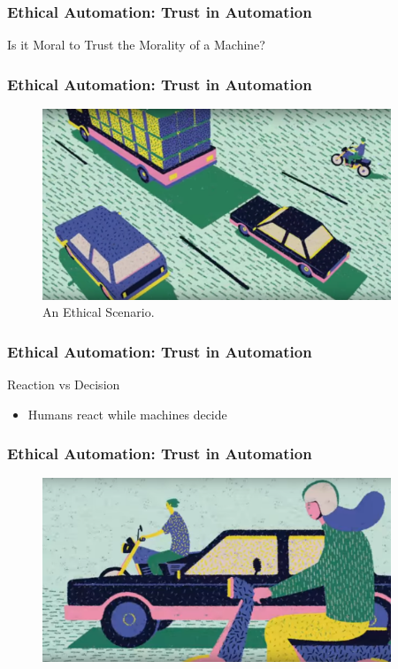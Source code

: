 \begin{frame}
	\frametitle{ Ethical Automation: Trust in Automation}
	\Large{Is it Moral to Trust the Morality of a Machine?}
\end{frame}


\begin{frame}
	\frametitle{ Ethical Automation: Trust in Automation}
	\begin{figure}[bht]
		\centering
		\includegraphics[width=4.1in]{diagrams/image00}
		\caption{An Ethical Scenario.}
		\label{fig:-deg}
	\end{figure}
\end{frame}


\begin{frame}
	\frametitle{ Ethical Automation: Trust in Automation}
	{\Large Reaction vs Decision}
	\begin{itemize}
		\item Humans react while machines decide
	\end{itemize}
\end{frame}


\begin{frame}
	\frametitle{ Ethical Automation: Trust in Automation}
	\begin{figure}[bht]
		\centering
		\includegraphics[width=4.1in]{diagrams/image01}
		\caption{}
		\label{fig:-deg}
	\end{figure}
\end{frame}


